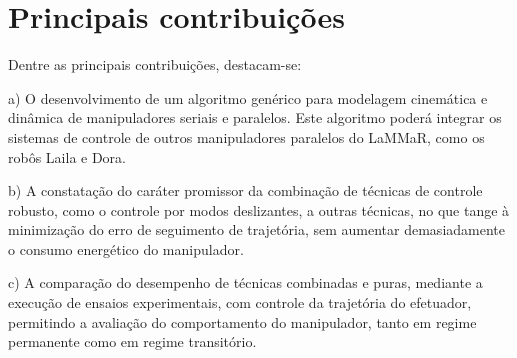 \documentclass[]{politex}
\begin{document}

\section{Principais contribuições}

Dentre as principais contribuições, destacam-se:

a) O desenvolvimento de um algoritmo genérico para modelagem cinemática e dinâmica de manipuladores seriais e paralelos. Este algoritmo poderá integrar os sistemas de controle de outros manipuladores paralelos do LaMMaR, como os robôs Laila e Dora.

b) A constatação do caráter promissor da combinação de técnicas de controle robusto, como o controle por modos deslizantes, a outras técnicas, no que tange à minimização do erro de seguimento de trajetória, sem aumentar demasiadamente o consumo energético do manipulador.

c) A comparação do desempenho de técnicas combinadas e puras, mediante a execução de ensaios experimentais, com controle da trajetória do efetuador, permitindo a avaliação do comportamento do manipulador, tanto em regime permanente como em regime transitório.
\end{document}
